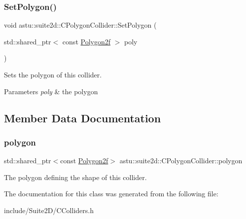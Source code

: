 \subsubsection{\texorpdfstring{Set\+Polygon()}{SetPolygon()}}
{\footnotesize\ttfamily void astu\+::suite2d\+::\+C\+Polygon\+Collider\+::\+Set\+Polygon (\begin{DoxyParamCaption}\item[{std\+::shared\+\_\+ptr$<$ const \hyperlink{group__math__group_ga39ca0cd425ff5edd2a090d6997ce8c2a}{Polygon2f} $>$}]{poly }\end{DoxyParamCaption})\hspace{0.3cm}{\ttfamily [inline]}}

Sets the polygon of this collider.


\begin{DoxyParams}{Parameters}
{\em poly} & the polygon \\
\hline
\end{DoxyParams}


\subsection{Member Data Documentation}
\mbox{\label{classastu_1_1suite2d_1_1CPolygonCollider_a5fdae8e0614b5810fb2d1add8b7daf87}} 
\subsubsection{\texorpdfstring{polygon}{polygon}}
{\footnotesize\ttfamily std\+::shared\+\_\+ptr$<$const \hyperlink{group__math__group_ga39ca0cd425ff5edd2a090d6997ce8c2a}{Polygon2f}$>$ astu\+::suite2d\+::\+C\+Polygon\+Collider\+::polygon\hspace{0.3cm}{\ttfamily [protected]}}

The polygon defining the shape of this collider. 

The documentation for this class was generated from the following file\+:\begin{DoxyCompactItemize}
\item 
include/\+Suite2\+D/C\+Colliders.\+h\end{DoxyCompactItemize}
